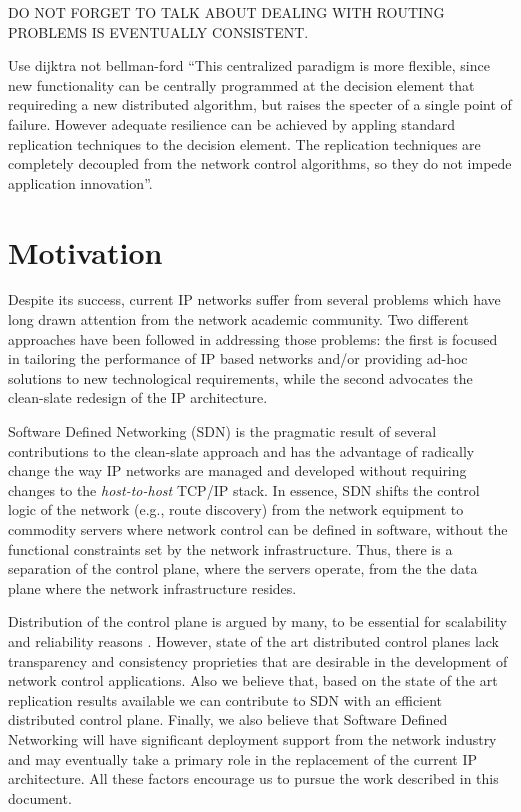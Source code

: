 DO NOT FORGET TO TALK ABOUT DEALING WITH ROUTING PROBLEMS IS EVENTUALLY CONSISTENT. 


Use dijktra not bellman-ford 
``This centralized paradigm is more flexible, since new functionality can be centrally programmed at the decision element that requireding a new distributed algorithm, but raises the specter of a single point of failure. However adequate resilience can be achieved by appling standard replication techniques to the decision element. The replication techniques are completely decoupled from the network control algorithms, so they do not impede application innovation''. 


\section{Motivation}
Despite its success, current IP networks suffer from several problems 
which have long drawn attention from the network academic community. Two different approaches have been followed in addressing those problems: the first is focused in tailoring the performance of IP based networks and/or providing ad-hoc solutions to new technological requirements, while the second  advocates the clean-slate redesign of the IP architecture. 

Software Defined Networking (SDN) \cite{ONF:2012ui} is the pragmatic result of several contributions to the clean-slate approach and has the advantage of radically change the way IP networks are managed and developed without requiring changes to the \emph{host-to-host} TCP/IP stack. In essence, SDN shifts the control logic of the network (e.g., route discovery) from the network equipment to commodity servers where network control can  be defined in software, without the functional constraints set by the network infrastructure. Thus, there is a separation of the control plane, where the servers operate, from the the data plane where the network infrastructure resides. 

Distribution of the control plane is argued by many, to be essential for scalability and reliability reasons \cite{Tootoonchian:2010vy, Koponen:2010th,Yeganeh:2012jm,:zr}. However, state of the art  distributed control planes lack transparency and consistency proprieties that are desirable in the development of network control applications. Also we believe that, based on the state of the art replication results available \cite{Rao:2011vz,Lee:1996jm,Bolosky:2011ve,Wang:2012tj} we can contribute to SDN with an efficient distributed control plane. Finally, we also believe that Software Defined Networking will have significant deployment support from the network industry and may eventually take a primary role in the replacement of the current IP architecture. All these factors  encourage us to pursue the work described in this document.



